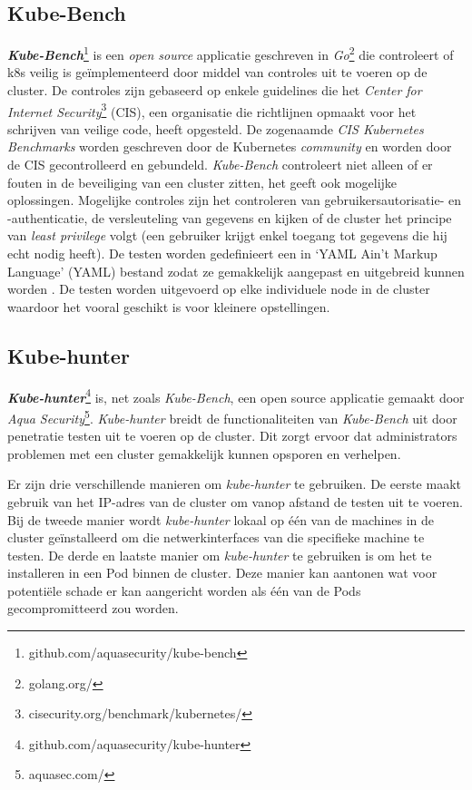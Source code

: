 \subsection{Kube-Bench} \label{bench}
\textbf{\textit{Kube-Bench}}\footnote{github.com/aquasecurity/kube-bench} is een \textit{open source} applicatie geschreven in \textit{Go}\footnote{golang.org/} die controleert of k8s veilig is geïmplementeerd door middel van controles uit te voeren op de cluster. De controles zijn gebaseerd op enkele guidelines die het \textit{Center for Internet Security}\footnote{cisecurity.org/benchmark/kubernetes/} (CIS), een organisatie die richtlijnen opmaakt voor het schrijven van veilige code, heeft opgesteld. De zogenaamde \textit{CIS Kubernetes Benchmarks} worden geschreven door de Kubernetes \textit{community} en worden door de CIS gecontrolleerd en gebundeld. \textit{Kube-Bench} controleert niet alleen of er fouten in de beveiliging van een cluster zitten, het geeft ook mogelijke oplossingen. Mogelijke controles zijn het controleren van gebruikersautorisatie- en -authenticatie, de versleuteling van gegevens en kijken of de cluster het principe van \textit{least privilege} volgt (een gebruiker krijgt enkel toegang tot gegevens die hij echt nodig heeft). De testen worden gedefinieert een in `YAML Ain't Markup Language' (YAML) bestand zodat ze gemakkelijk aangepast en uitgebreid kunnen worden \autocite{Rice2021}. De testen worden uitgevoerd op elke individuele node in de cluster waardoor het vooral geschikt is voor kleinere opstellingen.

\subsection{Kube-hunter} \label{hunter}

\textbf{\textit{Kube-hunter}}\footnote{github.com/aquasecurity/kube-hunter} is, net zoals \textit{Kube-Bench}, een open source applicatie gemaakt door \textit{Aqua Security}\footnote{aquasec.com/}. \textit{Kube-hunter} breidt de functionaliteiten van \textit{Kube-Bench} uit door penetratie testen uit te voeren op de cluster. Dit zorgt ervoor dat administrators problemen met een cluster gemakkelijk kunnen opsporen en verhelpen.

Er zijn drie verschillende manieren om \textit{kube-hunter} te gebruiken. De eerste maakt gebruik van het IP-adres van de cluster om vanop afstand de testen uit te voeren. Bij de tweede manier wordt \textit{kube-hunter} lokaal op één van de machines in de cluster geïnstalleerd om die netwerkinterfaces van die specifieke machine te testen. De derde en laatste manier om \textit{kube-hunter} te gebruiken is om het te installeren in een Pod binnen de cluster. Deze manier kan aantonen wat voor potentiële schade er kan aangericht worden als één van de Pods gecompromitteerd zou worden.